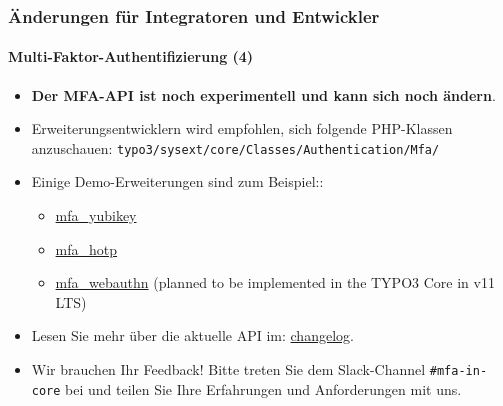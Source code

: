 %

\begin{frame}[fragile]
	\frametitle{Änderungen für Integratoren und Entwickler}
	\framesubtitle{Multi-Faktor-Authentifizierung (4)}

	\begin{itemize}

		\item \textbf{Der MFA-API ist noch experimentell und kann sich noch ändern}.

		\item Erweiterungsentwicklern wird empfohlen, sich folgende PHP-Klassen anzuschauen:\newline
			\small\texttt{typo3/sysext/core/Classes/Authentication/Mfa/}\normalsize

		\item Einige Demo-Erweiterungen sind zum Beispiel::

			\begin{itemize}\small
				\item \href{https://github.com/derhansen/mfa_yubikey}{mfa\_yubikey}
				\item \href{https://github.com/o-ba/mfa_hotp}{mfa\_hotp}
				\item \href{https://github.com/bnf/mfa_webauthn}{mfa\_webauthn} (planned to be implemented in the TYPO3 Core in v11 LTS)
			\end{itemize}\normalsize

		\item Lesen Sie mehr über die aktuelle API im:
			\href{https://docs.typo3.org/c/typo3/cms-core/master/en-us/Changelog/11.1/Feature-93526-MultiFactorAuthentication.html}{changelog}.

		\item Wir brauchen Ihr Feedback! Bitte treten Sie dem Slack-Channel \texttt{\#mfa-in-core} bei
			und teilen Sie Ihre Erfahrungen und Anforderungen mit uns.

	\end{itemize}

\end{frame}

